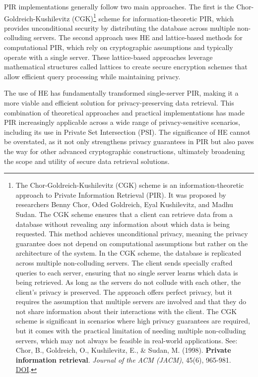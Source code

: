 \documentclass[
  letterpaper,
  DIV=11,
  numbers=noendperiod,
  oneside]{scrartcl}
\begin{document}
PIR implementations generally follow two main approaches. The first is
the Chor-Goldreich-Kushilevitz (CGK)\footnote{The
  Chor-Goldreich-Kushilevitz (CGK) scheme is an information-theoretic
  approach to Private Information Retrieval (PIR). It was proposed by
  researchers Benny Chor, Oded Goldreich, Eyal Kushilevitz, and Madhu
  Sudan. The CGK scheme ensures that a client can retrieve data from a
  database without revealing any information about which data is being
  requested. This method achieves unconditional privacy, meaning the
  privacy guarantee does not depend on computational assumptions but
  rather on the architecture of the system. In the CGK scheme, the
  database is replicated across multiple non-colluding servers. The
  client sends specially crafted queries to each server, ensuring that
  no single server learns which data is being retrieved. As long as the
  servers do not collude with each other, the client's privacy is
  preserved. The approach offers perfect privacy, but it requires the
  assumption that multiple servers are involved and that they do not
  share information about their interactions with the client. The CGK
  scheme is significant in scenarios where high privacy guarantees are
  required, but it comes with the practical limitation of needing
  multiple non-colluding servers, which may not always be feasible in
  real-world applications. See: Chor, B., Goldreich, O., Kushilevitz,
  E., \& Sudan, M. (1998). \textbf{Private information retrieval}.
  \emph{Journal of the ACM (JACM)}, 45(6), 965-981.
  \href{https://doi.org/10.1145/293347.293350}{DOI}.} scheme for
information-theoretic PIR, which provides unconditional security by
distributing the database across multiple non-colluding servers. The
second approach uses HE and lattice-based methods for computational PIR,
which rely on cryptographic assumptions and typically operate with a
single server. These lattice-based approaches leverage mathematical
structures called lattices to create secure encryption schemes that
allow efficient query processing while maintaining privacy.

The use of HE has fundamentally transformed single-server PIR, making it
a more viable and efficient solution for privacy-preserving data
retrieval. This combination of theoretical approaches and practical
implementations has made PIR increasingly applicable across a wide range
of privacy-sensitive scenarios, including its use in Private Set
Intersection (PSI). The significance of HE cannot be overstated, as it
not only strengthens privacy guarantees in PIR but also paves the way
for other advanced cryptographic constructions, ultimately broadening
the scope and utility of secure data retrieval solutions.
\end{document}

